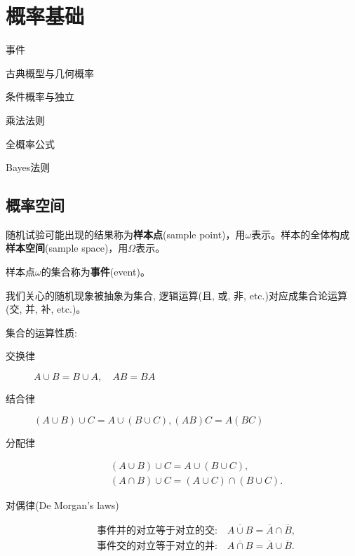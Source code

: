 \chapter{概率基础}

\begin{introduction}
    \item 事件
    \item 古典概型与几何概率
    \item 条件概率与独立
    \item 乘法法则
    \item 全概率公式
    \item Bayes法则
\end{introduction}

\section{概率空间}

\begin{definition}[样本空间]
    随机试验可能出现的结果称为\textbf{样本点}(sample point)，用$\omega$表示。样本的全体构成\textbf{样本空间}(sample space)，用$\Omega$表示。
\end{definition}

\begin{definition}[事件的古典定义]
    样本点$\omega$的集合称为\textbf{事件}(event)。
\end{definition}

我们关心的随机现象被抽象为集合, 逻辑运算(且, 或, 非, etc.)对应成集合论运算(交, 并, 补, etc.)。

\begin{property}
    集合的运算性质:
    \begin{description}
        \item [交换律] $A \cup B = B \cup A, \quad AB = BA$
        \item [结合律] $(A \cup B) \cup C = A \cup (B \cup C), (AB)C = A(BC)$
        \item [分配律]
              \begin{gather}
                  (A \cup B) \cup C = A \cup (B \cup C),\\
                  (A \cap B) \cup C = (A \cup C) \cap (B \cup C).
              \end{gather}
        \item [对偶律(De Morgan's laws)]
              \begin{gather}
                  \text{事件并的对立等于对立的交:} \quad \overline{A \cup B} = \overline{A} \cap \overline{B},\\
                  \text{事件交的对立等于对立的并:} \quad \overline{A \cap B} = \overline{A} \cup \overline{B}.
              \end{gather}
    \end{description}
\end{property}

